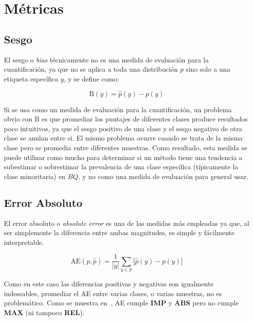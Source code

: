 \section{Métricas}\label{evaluacion:metricas}

\subsection{Sesgo}

El sesgo o {\it bias\/} técnicamente no es una medida de evaluación para la
cuantificación, ya que no se aplica a toda una distribución $p$ sino solo a una
etiqueta específica $y$, y se define como:

\begin{equation}
    {\text{B}(y)} = \hat p(y) - p(y)
\end{equation}

Si se usa como un medida de evaluación para la cuantificación, un problema obvio
con B es que promediar los puntajes de diferentes clases produce resultados poco
intuitivos, ya que el sesgo positivo de una clase y el sesgo negativo de otra
clase se anulan entre sí. El mismo problema ocurre cuando se trata de la misma
clase pero se promedia entre diferentes muestras. Como resultado, esta medida se
puede utilizar como mucho para determinar si un método tiene una tendencia a
subestimar o sobrestimar la prevalencia de una clase específica (típicamente la
clase minoritaria) en $BQ$, y no como una medida de evaluación para general
usar.

\subsection{Error Absoluto}

El error absoluto o {\it absolute error\/} es una de las medidas más empleadas
ya que, al ser simplemente la diferencia entre ambas magnitudes, es simple y
fácilmente interpretable.

\begin{equation}
    {\text{AE}(p, \hat p)} = \frac{1}{|y|}\sum _{y\in {\mathcal {Y}}}{|\hat p(y) - p(y)|}
\end{equation}

Como en este caso las diferencias positivas y negativas son igualmente
indeseables, promediar el AE entre varias clases, o varias muestras, no es
problemático. Como se muestra en~\cite{sebastiani2020evaluation}, AE cumple {\bf
IMP} y {\bf ABS} pero no cumple {\bf MAX} (ni tampoco {\bf REL}).

